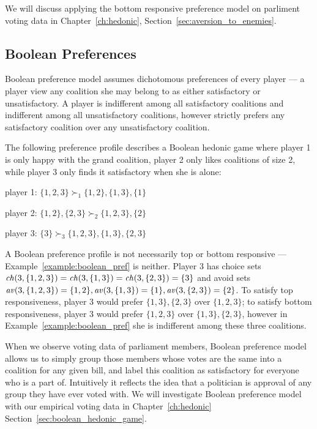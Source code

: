 We will discuss applying the bottom responsive preference model on parliment
voting data in Chapter~\ref{ch:hedonic}, Section~\ref{sec:aversion_to_enemies}.

\subsection{Boolean Preferences}
\label{subsec:boolean_preferences}
Boolean preference model assumes dichotomous preferences of every player ---
a player view any coalition she may belong to as either satisfactory or
unsatisfactory.
A player is indifferent among all satisfactory coalitions and indifferent
among all unsatisfactory coalitions, however strictly prefers any satisfactory
coalition over any unsatisfactory coalition.

\begin{example}
\label{example:boolean_pref}
  The following preference profile describes a Boolean hedonic game where
  player 1 is only happy with the grand coalition, player 2 only likes coalitions
  of size 2, while player 3 only finds it satisfactory when she is alone:

  player 1: $\{1, 2, 3\} \succ_1 \{1, 2\}, \{1, 3\}, \{1\}$

  player 2: $\{1, 2\}, \{2, 3\} \succ_2 \{1, 2, 3\}, \{2\}$

  player 3: $\{3\} \succ_3 \{1, 2, 3\}, \{1, 3\}, \{2, 3\}$
\end{example}

A Boolean preference profile is not necessarily top or bottom responsive --- 
Example~\ref{example:boolean_pref} is neither.
Player 3 has choice sets
$\mathit{ch}(3, \{1, 2, 3\}) = \mathit{ch}(3, \{1, 3\}) = \mathit{ch}(3, \{2, 3\}) = \{3\}$ and avoid sets 
$\mathit{av}(3, \{1, 2, 3\}) = \{1, 2\}, \mathit{av}(3, \{1, 3\}) = \{1\},
\mathit{av}(3, \{2, 3\}) = \{2\}$.
To satisfy top responsiveness, player 3 would prefer $\{1, 3\}, \{2, 3\}$ over
$\{1, 2, 3\}$; to satisfy bottom responsiveness, player 3 would prefer
$\{1, 2, 3\}$ over $\{1, 3\}, \{2, 3\}$, however in Example~\ref{example:boolean_pref} she is indifferent among these three coalitions.

When we observe voting data of parliament members, Boolean preference model
allows us to simply group those members whose votes are the same into a coalition
for any given bill, and label this coalition as satisfactory for everyone who is
a part of.
Intuitively it reflects the idea that a politician is approval of any group they
have ever voted with.
We will investigate Boolean preference model with our empirical voting data in
Chapter~\ref{ch:hedonic} Section~\ref{sec:boolean_hedonic_game}.


